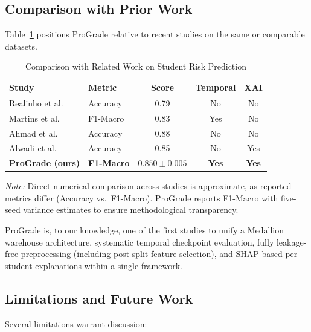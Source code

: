 \documentclass[conference,a4paper]{IEEEtran}
\begin{document}
\subsection{Comparison with Prior Work}

Table~\ref{tab:comparison} positions ProGrade relative to recent studies on the same or comparable datasets.

\begin{table}[htbp]
\centering
\caption{Comparison with Related Work on Student Risk Prediction}
\label{tab:comparison}
\begin{tabular}{llccc}
\toprule
\textbf{Study} & \textbf{Metric} & \textbf{Score} & \textbf{Temporal} & \textbf{XAI} \\
\midrule
Realinho et al.\ \cite{realinho2022} & Accuracy & 0.79 & No & No \\
Martins et al.\ \cite{martins2023phased} & F1-Macro & 0.83 & Yes & No \\
Ahmad et al.\ \cite{icdsns2024ensemble} & Accuracy & 0.88 & No & No \\
Alwadi et al.\ \cite{nature2025xai} & Accuracy & 0.85 & No & Yes \\
\textbf{ProGrade (ours)} & \textbf{F1-Macro} & $\mathbf{0.850 \pm 0.005}$ & \textbf{Yes} & \textbf{Yes} \\
\bottomrule
\end{tabular}
\end{table}

\noindent\textit{Note:} Direct numerical comparison across studies is approximate, as reported metrics differ (Accuracy vs.\ F1-Macro). ProGrade reports F1-Macro with five-seed variance estimates to ensure methodological transparency.

ProGrade is, to our knowledge, one of the first studies to unify a Medallion warehouse architecture, systematic temporal checkpoint evaluation, fully leakage-free preprocessing (including post-split feature selection), and SHAP-based per-student explanations within a single framework.

\subsection{Limitations and Future Work}

Several limitations warrant discussion:
\end{document}
